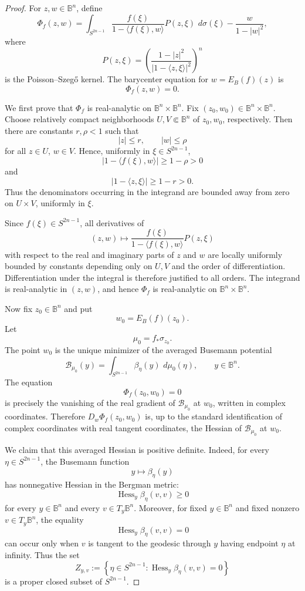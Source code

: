 \documentclass[11pt]{article}
\newcommand{\Hess}{\operatorname{Hess}}
\theoremstyle{definition}
\theoremstyle{remark}
\theoremstyle{definition}
\newcommand{\B}{\mathbb B}
\newcommand{\dd}{\,d}
\begin{document}
\begin{proof}
For \(z,w\in\B^n\), define
\[
        \Phi_f(z,w)
        =
        \int_{S^{2n-1}}
        \frac{f(\xi)}{1-\langle f(\xi),w\rangle}
        P(z,\xi)\,\dd\sigma(\xi)
        -
        \frac{w}{1-|w|^2},
\]
where
\[
        P(z,\xi)
        =
        \left(
        \frac{1-|z|^2}{|1-\langle z,\xi\rangle|^2}
        \right)^n
\]
is the Poisson--Szeg\H{o} kernel. The barycenter equation for
\(w=E_B(f)(z)\) is
\[
        \Phi_f(z,w)=0.
\]

We first prove that \(\Phi_f\) is real-analytic on
\(\B^n\times\B^n\). Fix \((z_0,w_0)\in\B^n\times\B^n\). Choose relatively
compact neighborhoods \(U,V\Subset\B^n\) of \(z_0,w_0\), respectively. Then
there are constants \(r,\rho<1\) such that
\[
        |z|\le r,\qquad |w|\le \rho
\]
for all \(z\in U\), \(w\in V\). Hence, uniformly in
\(\xi\in S^{2n-1}\),
\[
        |1-\langle f(\xi),w\rangle|
        \ge 1-\rho>0
\]
and
\[
        |1-\langle z,\xi\rangle|
        \ge 1-r>0.
\]
Thus the denominators occurring in the integrand are bounded away from zero
on \(U\times V\), uniformly in \(\xi\).

Since \(f(\xi)\in S^{2n-1}\), all derivatives of
\[
        (z,w)\mapsto
        \frac{f(\xi)}{1-\langle f(\xi),w\rangle}P(z,\xi)
\]
with respect to the real and imaginary parts of \(z\) and \(w\) are locally
uniformly bounded by constants depending only on \(U,V\) and the order of
differentiation. Differentiation under the integral is therefore justified to
all orders. The integrand is real-analytic in \((z,w)\), and hence
\(\Phi_f\) is real-analytic on \(\B^n\times\B^n\).

Now fix \(z_0\in\B^n\) and put
\[
        w_0=E_B(f)(z_0).
\]
Let
\[
        \mu_0=f_*\sigma_{z_0}.
\]
The point \(w_0\) is the unique minimizer of the averaged Busemann potential
\[
        \mathcal B_{\mu_0}(y)
        =
        \int_{S^{2n-1}}\beta_\eta(y)\,\dd\mu_0(\eta),
        \qquad y\in\B^n.
\]
The equation
\[
        \Phi_f(z_0,w_0)=0
\]
is precisely the vanishing of the real gradient of
\(\mathcal B_{\mu_0}\) at \(w_0\), written in complex coordinates. Therefore
\(D_w\Phi_f(z_0,w_0)\) is, up to the standard identification of complex
coordinates with real tangent coordinates, the Hessian of
\(\mathcal B_{\mu_0}\) at \(w_0\).

We claim that this averaged Hessian is positive definite. Indeed, for every
\(\eta\in S^{2n-1}\), the Busemann function
\[
        y\mapsto \beta_\eta(y)
\]
has nonnegative Hessian in the Bergman metric:
\[
        \Hess_y\beta_\eta(v,v)\ge 0
\]
for every \(y\in\B^n\) and every \(v\in T_y\B^n\). Moreover, for fixed
\(y\in\B^n\) and fixed nonzero \(v\in T_y\B^n\), the equality
\[
        \Hess_y\beta_\eta(v,v)=0
\]
can occur only when \(v\) is tangent to the geodesic through \(y\) having
endpoint \(\eta\) at infinity. Thus the set
\[
        Z_{y,v}
        :=
        \left\{
        \eta\in S^{2n-1}:
        \Hess_y\beta_\eta(v,v)=0
        \right\}
\]
is a proper closed subset of \(S^{2n-1}\).


\end{proof}
\end{document}
